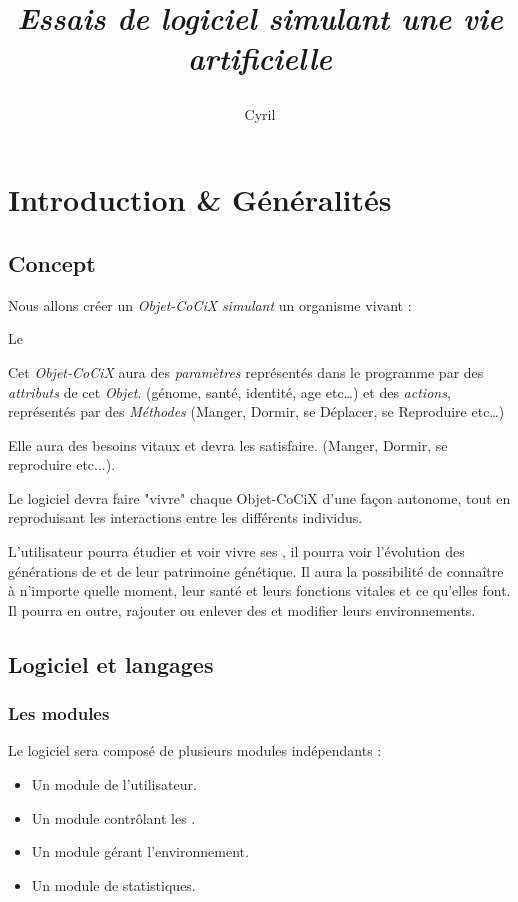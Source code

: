 \documentclass[french]{report}
\title{\begin{Huge}
\CoCiX
\end{Huge}\\
\small
\emph{Essais de logiciel simulant une vie artificielle}
}
\author{Cyril \bsc{LORIN}}
\newlength{\du}\fi
\begin{document}
\maketitle
\newpage
\tableofcontents
\newpage
\chapter{Introduction \& Généralités}
\section{Concept}
Nous allons créer un \textit{Objet-CoCiX} \textit{simulant} un organisme vivant :\\

\begin{center}
\begin{large}
Le \CoCiX
\end{large}
\end{center}

Cet \textit{Objet-CoCiX} aura des \textit{paramètres} représentés dans le programme par des \emph{attributs} de cet \textit{Objet}. (génome, santé, identité, age etc\dots) et des \textit{actions}, représentés par des \emph{Méthodes} (Manger, Dormir, se Déplacer, se Reproduire etc\dots)

Elle aura des besoins vitaux et devra les satisfaire. (Manger, Dormir, se reproduire etc...).

Le logiciel devra faire "vivre" chaque Objet-CoCiX d'une façon autonome, tout en reproduisant les interactions entre les différents individus.

L'utilisateur pourra étudier et voir vivre ses \CoCiX, il pourra voir l'évolution des générations de \CoCiX et de leur patrimoine génétique. Il aura la possibilité de connaître à n'importe quelle moment, leur santé et leurs fonctions vitales et ce qu'elles font. Il pourra en outre, rajouter ou enlever des \CoCiX et modifier leurs environnements.
\section{Logiciel et langages}
\subsection{Les modules}
Le logiciel sera composé de plusieurs modules indépendants :

\begin{itemize}
\item Un module de l'utilisateur.
\item Un module contrôlant les \CoCiX.
\item Un module gérant l'environnement.
\item Un module de statistiques.
\end{itemize}
\end{document}
